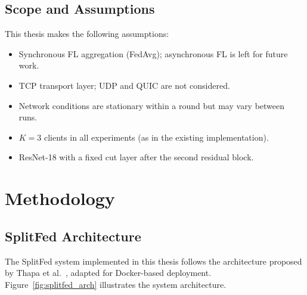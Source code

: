 \documentclass[12pt,a4paper]{report}
\begin{document}
\section{Scope and Assumptions}

This thesis makes the following assumptions:
\begin{itemize}
  \item Synchronous FL aggregation (FedAvg); asynchronous FL is left for future work.
  \item TCP transport layer; UDP and QUIC are not considered.
  \item Network conditions are stationary within a round but may vary between runs.
  \item $K = 3$ clients in all experiments (as in the existing implementation).
  \item ResNet-18 with a fixed cut layer after the second residual block.
\end{itemize}

\chapter{Methodology}
\label{ch:method}

\section{SplitFed Architecture}

The SplitFed system implemented in this thesis follows the architecture proposed by Thapa et al.\ \cite{thapa2022splitfed}, adapted for Docker-based deployment. Figure~\ref{fig:splitfed_arch} illustrates the system architecture.
\end{document}
